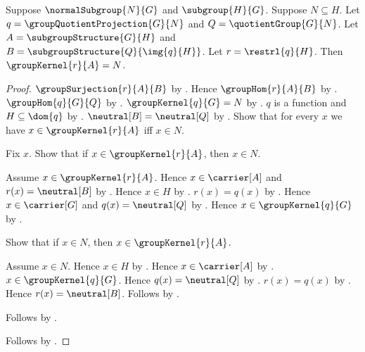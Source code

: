 \begin{theorem}\label{group_quotient_correspondence_restriction_kernel}
    Suppose $\normalSubgroup{N}{G}$ and $\subgroup{H}{G}$.
    Suppose $N\subseteq H$.
    Let $q=\groupQuotientProjection{G}{N}$ and
        $Q=\quotientGroup{G}{N}$.
    Let $A=\subgroupStructure{G}{H}$ and
        $B=\subgroupStructure{Q}{\img{q}{H}}$.
    Let $r=\restrl{q}{H}$.
    Then $\groupKernel{r}{A}=N$.
\end{theorem}
\begin{proof}
    $\groupSurjection{r}{A}{B}$ by
        .
    Hence $\groupHom{r}{A}{B}$ by .
    $\groupHom{q}{G}{Q}$ by
        .
    $\groupKernel{q}{G}=N$ by
        .
    $q$ is a function and $H\subseteq\dom{q}$ by
        .
    $\neutral[B]=\neutral[Q]$ by
        .
    Show that for every $x$ we have
        $x\in\groupKernel{r}{A}$ iff $x\in N$.
    \begin{subproof}
        Fix $x$.
        Show that if $x\in\groupKernel{r}{A}$, then $x\in N$.
        \begin{subproof}
            Assume $x\in\groupKernel{r}{A}$.
            Hence $x\in\carrier[A]$ and $r(x)=\neutral[B]$ by
                .
            Hence $x\in H$ by .
            $r(x)=q(x)$ by .
            Hence $x\in\carrier[G]$ and $q(x)=\neutral[Q]$ by
                .
            Hence $x\in\groupKernel{q}{G}$ by
                .
        \end{subproof}
        Show that if $x\in N$, then $x\in\groupKernel{r}{A}$.
        \begin{subproof}
            Assume $x\in N$.
            Hence $x\in H$ by .
            Hence $x\in\carrier[A]$ by
                .
            $x\in\groupKernel{q}{G}$.
            Hence $q(x)=\neutral[Q]$ by .
            $r(x)=q(x)$ by .
            Hence $r(x)=\neutral[B]$.
            Follows by .
        \end{subproof}
        Follows by \auto.
    \end{subproof}
    Follows by .
\end{proof}

